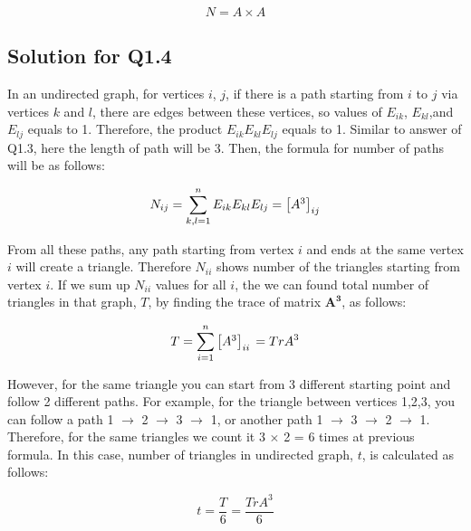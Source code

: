 \documentclass[11pt,a4,twocolumn]{article}
\theoremstyle{plain}
\theoremstyle{definition}
\theoremstyle{remark}
\begin{document}
\[
N =  A \times A
\]

\subsection{Solution for Q1.4}

In an undirected graph, for vertices $i$, $j$, if there is a path starting from $i$ to $j$ via vertices $k$ and $l$, there are edges between these vertices, so values of $E_{ik}$, $E_{kl}$,and $E_{lj}$ equals to 1. Therefore, the product $E_{ik}$$E_{kl}$$E_{lj}$ equals to 1. Similar to answer of Q1.3, here the length of path will be 3. Then, the formula for number of paths will be as follows:

\[
N_{ij}=  \sum_{k,l=1}^n E_{ik}E_{kl}E_{lj}\\
= 
\begin{bmatrix}
 A^3 \\
\end{bmatrix}
_{ij}
\]


\par
\noindent  From all these paths, any path starting from vertex $i$ and ends at the same vertex $i$ will create a triangle. Therefore $N_{ii}$ shows number of the triangles starting from vertex $i$. If we sum up $N_{ii}$ values for all $i$, the we can found total number of triangles in that graph,  $T$, by finding the trace of matrix $\mathbf{A^3}$, as follows:

\[
T =  \sum_{i=1}^n \begin{bmatrix}
 A^3 \\
\end{bmatrix}
_{ii}\\
= Tr A^3
\]

\par
\noindent However, for the same triangle you can start from 3 different starting point and follow 2 different paths. For example, for the triangle between vertices 1,2,3, you can follow a path 1 $\rightarrow$ 2 $\rightarrow$ 3 $\rightarrow$ 1, or another path 1 $\rightarrow$ 3 $\rightarrow$ 2 $\rightarrow$ 1. Therefore, for the same triangles we count it 3 $\times$ 2 = 6 times at previous formula. In this case, number of triangles in undirected graph, $t$,  is calculated as follows: 

\[
t= \frac{T}{6} = \frac{Tr A^3}{6}
\]


\end{document}
